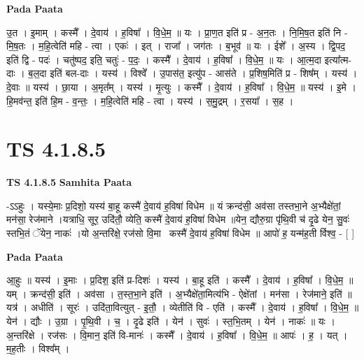 \documentclass[17pt]{extarticle}
\begin{document}
\textbf{Pada Paata} \newline

उ॒त । इ॒माम् । कस्मै᳚ । दे॒वाय॑ । ह॒विषा᳚ । वि॒धे॒म॒ ॥ यः । प्रा॒ण॒त इति॑ प्र - अ॒न॒तः । नि॒मि॒ष॒त इति॑ नि - मि॒ष॒तः । म॒हि॒त्वेति॑ महि - त्वा । एकः॑ । इत् । राजा᳚ । जग॑तः । ब॒भूव॑ ॥ यः । ईशे᳚ । अ॒स्य । द्वि॒पद॒ इति॑ द्वि - पदः॑ । चतु॑ष्पद॒ इति॒ चतुः॑ - प॒दः॒ । कस्मै᳚ । दे॒वाय॑ । ह॒विषा᳚ । वि॒धे॒म॒ ॥ यः । आ॒त्म॒दा इत्या᳚त्म-दाः । ब॒ल॒दा इति॑ बल-दाः । यस्य॑ । विश्वे᳚ । उ॒पास॑त॒ इत्यु॑प - आस॑ते । प्र॒शिष॒मिति॑ प्र - शिष᳚म् । यस्य॑ । दे॒वाः ॥ यस्य॑ । छा॒या । अ॒मृत᳚म् । यस्य॑ । मृ॒त्युः । कस्मै᳚ । दे॒वाय॑ । ह॒विषा᳚ । वि॒धे॒म॒ ॥ यस्य॑ । इ॒मे । हि॒मव॑न्त॒ इति॑ हि॒म - व॒न्तः॒ । म॒हि॒त्वेति॑ महि - त्वा । यस्य॑ । स॒मु॒द्रम् । र॒सया᳚ । स॒ह ।  \newline




\section*{ TS 4.1.8.5 }

\textbf{TS 4.1.8.5 } \newline
\textbf{Samhita Paata} \newline

-ऽऽहुः । यस्ये॒माः प्र॒दिशो॒ यस्य॑ बा॒हू कस्मै॑ दे॒वाय॑ ह॒विषा॑ विधेम ॥ यं क्रन्द॑सी॒ अव॑सा तस्तभा॒ने अ॒भ्यैक्षे॑तां॒ मन॑सा॒ रेज॑माने ।यत्राधि॒ सूर॒ उदि॑तौ॒ व्येति॒ कस्मै॑ दे॒वाय॑ ह॒विषा॑ विधेम ॥येन॒ द्यौरु॒ग्रा पृ॑थि॒वी च॑ दृ॒ढे येन॒ सु॒वः॑ स्तभि॒तं ॅयेन॒ नाकः॑ ।यो अ॒न्तरि॑क्षे॒ रज॑सो वि॒मानः᳡कस्मै॑ दे॒वाय॑ ह॒विषा॑ विधेम ॥ आपो॑ ह॒ यन्म॑ह॒ती र्विश्व॒ - [  ] \newline

\textbf{Pada Paata} \newline

आ॒हुः ॥ यस्य॑ । इ॒माः । प्र॒दिश॒ इति॑ प्र-दिशः॑ । यस्य॑ । बा॒हू इति॑ । कस्मै᳚ । दे॒वाय॑ । ह॒विषा᳚ । वि॒धे॒म॒ ॥ यम् । क्रन्द॑सी॒ इति॑ । अव॑सा । त॒स्त॒भा॒ने इति॑ । अ॒भ्यैक्षे॑ता॒मित्य॑भि - ऐक्षे॑तां । मन॑सा । रेज॑माने॒ इति॑ ॥ यत्र॑ । अधीति॑ । सूरः॑ । उदि॑ता॒वित्युत् - इ॒तौ॒ । व्येतीति॑ वि - एति॑ । कस्मै᳚ । दे॒वाय॑ । ह॒विषा᳚ । वि॒धे॒म॒ ॥ येन॑ । द्यौः । उ॒ग्रा । पृ॒थि॒वी । च॒ । दृ॒ढे इति॑ । येन॑ । सुवः॑ । स्त॒भि॒तम् । येन॑ । नाकः॑ ॥ यः । अ॒न्तरि॑क्षे । रज॑सः । वि॒मान॒ इति॑ वि-मानः॑ । कस्मै᳚ । दे॒वाय॑ । ह॒विषा᳚ । वि॒धे॒म॒ ॥ आपः॑ । ह॒ । यत् । म॒ह॒तीः । विश्व᳚म् ।  \newline
\end{document}
